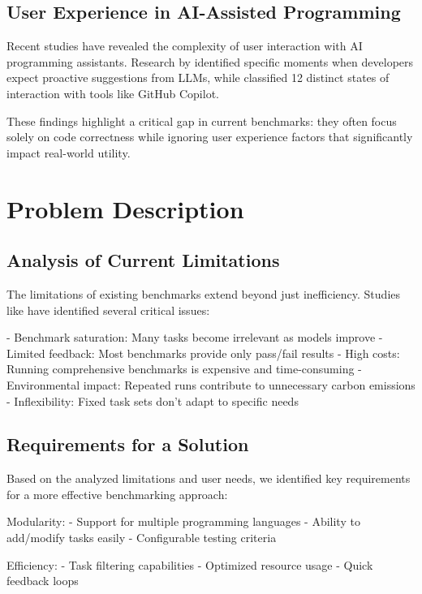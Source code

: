 \section{User Experience in AI-Assisted Programming}

Recent studies have revealed the complexity of user interaction with AI programming assistants. Research by \cite{needhelp2024} identified specific moments when developers expect proactive suggestions from LLMs, while \cite{readinglines2022} classified 12 distinct states of interaction with tools like GitHub Copilot.

These findings highlight a critical gap in current benchmarks: they often focus solely on code correctness while ignoring user experience factors that significantly impact real-world utility.

\chapter{Problem Description}

\section{Analysis of Current Limitations}

The limitations of existing benchmarks extend beyond just inefficiency. Studies like \cite{platinumbenchmarks2025} have identified several critical issues:

- Benchmark saturation: Many tasks become irrelevant as models improve
- Limited feedback: Most benchmarks provide only pass/fail results
- High costs: Running comprehensive benchmarks is expensive and time-consuming
- Environmental impact: Repeated runs contribute to unnecessary carbon emissions
- Inflexibility: Fixed task sets don't adapt to specific needs

\section{Requirements for a Solution}

Based on the analyzed limitations and user needs, we identified key requirements for a more effective benchmarking approach:

Modularity:
- Support for multiple programming languages
- Ability to add/modify tasks easily
- Configurable testing criteria

Efficiency:
- Task filtering capabilities
- Optimized resource usage
- Quick feedback loops

